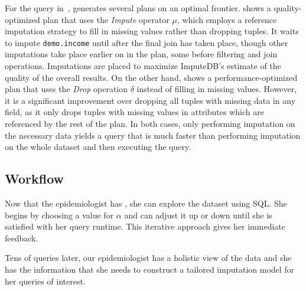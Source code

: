For the query in~, \ProjectName{} generates
several plans on an optimal frontier.  shows a quality-optimized plan that uses the \textit{Impute} operator $\mu$,
which employs a reference imputation strategy to fill in missing values rather than dropping tuples.
It waits to impute \verb|demo.income| until after the final join has taken place, though other imputations take place earlier on in the plan, some before filtering and join operations.
Imputations are placed to maximize ImputeDB's estimate of the quality of the overall results.
On the other hand,  shows a performance-optimized plan that uses the \textit{Drop} operation $\delta$ instead of filling in missing values.
However, it is a significant improvement over dropping all tuples with missing data in any field, as it only drops tuples with missing values in attributes which are referenced by the rest of the plan. In both cases, only performing
imputation on the necessary data yields a query that is much faster
than performing imputation on the whole dataset and then executing
the query.

\subsection{\ProjectName{} Workflow}
Now that the epidemiologist has \ProjectName{}, she can explore
the dataset using SQL. She begins by choosing a value for $\alpha$ and can adjust it up or
down until she is satisfied with her query runtime. This iterative approach gives her 
immediate feedback.


Tens of queries later, our epidemiologist has a holistic view of the data and she has the information that she needs to construct a tailored imputation model for her queries of interest.

%




